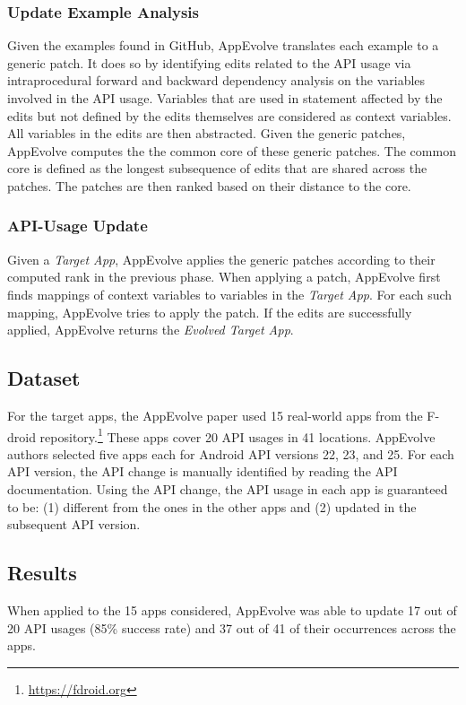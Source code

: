 \subsubsection{Update Example Analysis}
Given the examples found in GitHub, AppEvolve translates each example to a generic patch. It does so by identifying edits related to the API usage via intraprocedural forward and backward dependency analysis on the variables involved in the API usage. Variables that are used in statement affected by the edits but not defined by the edits themselves are considered as context variables. All variables in the edits are then abstracted. Given the generic patches, AppEvolve computes the the common core of these generic patches. The common core is defined as the longest subsequence of edits that are shared across the patches. The patches are then ranked based on their distance to the core.

\subsubsection{API-Usage Update}
Given a {\em Target App}, AppEvolve applies the generic patches according to their computed rank in the previous phase. When applying a patch, AppEvolve first finds mappings of context variables to variables in the {\em Target App}. For each such mapping, AppEvolve tries to apply the patch. If the edits are successfully applied, AppEvolve returns the {\em Evolved Target App}.

\subsection{Dataset}
For the target apps, the AppEvolve paper used 15 real-world apps from the F-droid repository.\footnote{\url{https://fdroid.org}} These  apps cover 20 API usages in 41 locations. AppEvolve authors selected five apps each for Android API versions 22, 23, and 25. For each API version, the API change is manually identified by reading the API
documentation. Using the API change, the API usage in each app is guaranteed to be: (1) different from the ones in the other apps and (2)
updated in the subsequent API version. 

\subsection{Results}
When applied to the 15 apps considered, AppEvolve was able to update 17 out of 20 API usages (85\% success rate) and 37 out of 41 of their occurrences across the apps.
